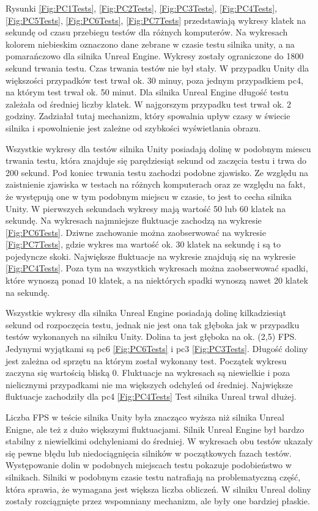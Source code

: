 \documentclass[12pt,twoside]{article}
\begin{document}
Rysunki
\ref{Fig:PC1Tests}, \ref{Fig:PC2Tests}, \ref{Fig:PC3Tests}, \ref{Fig:PC4Tests},
\ref{Fig:PC5Tests}, \ref{Fig:PC6Tests}, \ref{Fig:PC7Tests} przedstawiają wykresy
klatek na sekundę od czasu przebiegu testów dla różnych komputerów. Na wykresach
kolorem niebieskim oznaczono dane zebrane w czasie testu silnika unity, a na
pomarańczowo dla silnika Unreal Engine. Wykresy zostały ograniczone do 1800
sekund trwania testu. Czas trwania testów nie był stały. W przypadku Unity dla
większości przypadków test trwał ok. 30 minuy, poza jednym przypadkiem pc4, na
którym test trwał ok. 50 minut. Dla silnika Unreal Engine długość testu zależała
od średniej liczby klatek. W najgorszym przypadku test trwał ok. 2 godziny.
Zadziałał tutaj mechanizm, który spowalnia upływ czasy w świecie silnika i
spowolnienie jest zależne od szybkości wyświetlania obrazu. 

Wszystkie wykresy dla testów silnika Unity posiadają dolinę w podobnym miescu
trwania testu, która znajduje się parędziesiąt sekund od zaczęcia testu i trwa
do 200 sekund. Pod koniec trwania testu zachodzi podobne zjawisko. Ze względu na
zaistnienie zjawiska w testach na różnych komputerach oraz ze względu na fakt,
że występują one w tym podobnym miejscu w czasie, to jest to cecha silnika
Unity. W pierwszych sekundach wykresy mają wartość 50 lub 60 klatek na sekundę.
Na wykresach najmniejsze fluktuacje zachodzą na wykresie \ref{Fig:PC6Tests}.
Dziwne zachowanie można zaobserwować na wykresie \ref{Fig:PC7Tests}, gdzie
wykres ma wartość ok. 30 klatek na sekundę i są to pojedyncze skoki. Największe
fluktuacje na wykresie znajdują się na wykresie \ref{Fig:PC4Tests}. Poza tym na
wszystkich wykresach można zaobserwować spadki, które wynoszą ponad 10 klatek, a
na niektórych spadki wynoszą nawet 20 klatek na sekundę. 

Wszystkie wykresy dla silnika Unreal Engine posiadają dolinę kilkadziesiąt
sekund od rozpoczęcia testu, jednak nie jest ona tak głęboka jak w przypadku
testów wykonanych na silniku Unity. Dolina ta jest głęboka na ok. (2,5) FPS.
Jedynymi wyjątkami są pc6 \ref{Fig:PC6Tests} i pc3 \ref{Fig:PC3Tests}. Długość
doliny jest zależna od sprzętu na którym został wykonany test. Początek wykresu
zaczyna się wartością bliską 0. Fluktuacje na wykresach są niewielkie i poza
nielicznymi przypadkami nie ma większych odchyleń od średniej. Największe
fluktuacje zachodziły dla pc4 \ref{Fig:PC4Tests} Test silnika Unreal trwał
dłużej.

Liczba FPS w teście silnika Unity była znacząco wyższa niż silnika Unreal
Enigne, ale też z dużo większymi fluktuacjami. Silnik Unreal Engine był bardzo
stabilny z niewielkimi odchyleniami do średniej. W wykresach obu testów ukazały
się pewne błędu lub niedociągnięcia silników w początkowych fazach testów.
Występowanie dolin w podobnych miejscach testu pokazuje podobieństwo w
silnikach. Silniki w podobnym czasie testu natrafiają na problematyczną część,
która sprawia, że wymagana jest większa liczba obliczeń. W silniku Unreal doliny
zostały rozciągnięte przez wspomniany mechanizm, ale były one bardziej płaskie. 
\end{document}

